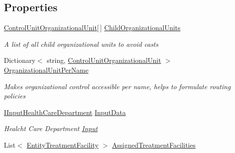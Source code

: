 \subsection*{Properties}
\begin{DoxyCompactItemize}
\item 
\hyperlink{class_general_health_care_elements_1_1_control_units_1_1_control_unit_organizational_unit}{Control\+Unit\+Organizational\+Unit}\mbox{[}$\,$\mbox{]} \hyperlink{class_general_health_care_elements_1_1_control_units_1_1_control_unit_health_care_department_a0ec2914069884d10f217bef7fcb4738e}{Child\+Organizational\+Units}
\begin{DoxyCompactList}\small\item\em A list of all child organizational units to avoid casts \end{DoxyCompactList}\item 
Dictionary$<$ string, \hyperlink{class_general_health_care_elements_1_1_control_units_1_1_control_unit_organizational_unit}{Control\+Unit\+Organizational\+Unit} $>$ \hyperlink{class_general_health_care_elements_1_1_control_units_1_1_control_unit_health_care_department_aa25086e836f01a12b9851b417191757a}{Organizational\+Unit\+Per\+Name}
\begin{DoxyCompactList}\small\item\em Makes organizational control accessible per name, helps to formulate routing policies \end{DoxyCompactList}\item 
\hyperlink{interface_general_health_care_elements_1_1_input_1_1_i_input_health_care_department}{I\+Input\+Health\+Care\+Department} \hyperlink{class_general_health_care_elements_1_1_control_units_1_1_control_unit_health_care_department_a086a9b4e380bee53f84d5b43733002a5}{Input\+Data}
\begin{DoxyCompactList}\small\item\em Healcht Care Department \hyperlink{namespace_general_health_care_elements_1_1_input}{Input} \end{DoxyCompactList}\item 
List$<$ \hyperlink{class_general_health_care_elements_1_1_entities_1_1_entity_treatment_facility}{Entity\+Treatment\+Facility} $>$ \hyperlink{class_general_health_care_elements_1_1_control_units_1_1_control_unit_health_care_department_a3243b7bd3532fe00a73472270e86c15b}{Assigned\+Treatment\+Facilities}

\end{DoxyCompactItemize}
